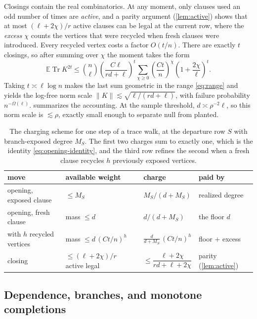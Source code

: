 \documentclass[11pt]{article}
\theoremstyle{definition}
\theoremstyle{remark}
\newcommand{\E}{\mathbb E}
\newcommand{\1}{\mathbf 1}
\DeclareMathOperator{\Tr}{Tr}
\numberwithin{equation}{section}
\begin{document}
Closings contain the real combinatorics.  At any moment, only clauses
used an odd number of times are \emph{active}, and a parity argument
(\cref{lem:active}) shows that at most $(\ell+2\chi)/r$ active clauses
can be legal at the current row, where the \emph{excess} $\chi$ counts
the vertices that were recycled when fresh clauses were introduced.
Every recycled vertex costs a factor $O(t/n)$.  There are exactly $t$
closings, so after summing over $\chi$ the moment takes the form
\[
 \E\Tr K^{2t}
 \le \binom n\ell
 \left(\frac{C\ell}{rd+\ell}\right)^t
 \sum_{\chi\ge0}
 \left(\frac{Ct}{n}\right)^\chi
 \left(1+\frac{2\chi}{\ell}\right)^t.
\]
Taking $t\asymp\ell\log n$ makes the last sum geometric in the range
\cref{eq:range} and yields the log-free norm scale
$\|K\|\lesssim\sqrt{\ell/(rd+\ell)}$, with failure probability
$n^{-\Omega(\ell)}$.   summarizes the accounting.
At the sample threshold, $d\asymp\rho^{-2}\ell$, so this norm scale is
$\lesssim\rho$, exactly small enough to separate null from planted.

\begin{table}[t]
\centering\small\renewcommand{\arraystretch}{1.35}
\begin{tabular}{@{}llll@{}}
\toprule
move & available weight & charge & paid by\\
\midrule
opening, exposed clause & $\le M_S$ & $M_S/(d+M_S)$ & realized degree\\
opening, fresh clause & mass $\le d$ & $d/(d+M_S)$ & the floor $d$\\
\quad with $h$ recycled vertices & mass $\le d\,(Ct/n)^h$ &
 $\frac{d}{d+M_S}\,(Ct/n)^h$ & floor $+$ excess\\
closing & $\le(\ell+2\chi)/r$ active legal &
 $\le\dfrac{\ell+2\chi}{rd+\ell+2\chi}$ & parity (\cref{lem:active})\\
\bottomrule
\end{tabular}
\caption{The charging scheme for one step of a trace walk, at the
departure row $S$ with branch-exposed degree $M_S$.  The first two
charges sum to exactly one, which is the identity
\cref{eq:opening-identity}, and the third row refines the second when a
fresh clause recycles $h$ previously exposed vertices.}
\label{tab:charges}
\end{table}

\subsection{Dependence, branches, and monotone completions}
\label{sec:tech-branch}
\end{document}
